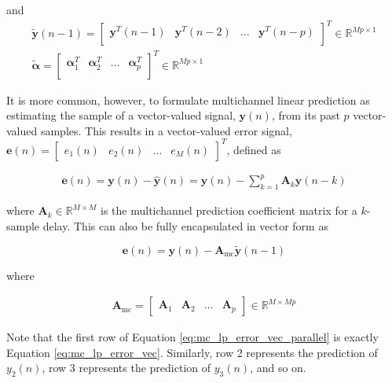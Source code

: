 \noindent
and
\begin{eqnarray}
	\boldsymbol{\tilde{y}}(n-1) = 
	\begin{bmatrix}
		\boldsymbol{y}^T(n-1) &	\boldsymbol{y}^T(n-2)  & \dots  & \boldsymbol{y}^T(n-p)   \\
	\end{bmatrix}^T  \in  \mathbb{R} ^ {Mp \times 1}\\
	\boldsymbol{\tilde{\alpha}} = 
	\begin{bmatrix}
		\boldsymbol{\alpha}^T_1 &	\boldsymbol{\alpha}^T_2  & \dots  & \boldsymbol{\alpha}^T_p \\
	\end{bmatrix}^T  \in  \mathbb{R} ^ {Mp \times 1}
\end{eqnarray}


It is more common, however, to formulate multichannel linear prediction as estimating the sample of a vector-valued signal, $\boldsymbol{y}(n)$, from its past $p$ vector-valued samples. This results in a vector-valued error signal, $\boldsymbol{e}(n) = \begin{bmatrix} e_1(n) & e_2(n) & \dots& e_M(n) \end{bmatrix}^T$, defined as

\begin{eqnarray}
	\boldsymbol{e}(n) = \boldsymbol{y}(n) - \boldsymbol{\hat{y}}(n) = \boldsymbol{y}(n) - \sum_{k=1}^{p} \boldsymbol{A}_k \boldsymbol{y}(n-k)  \label{eq:mc_lp_error_parallel}
\end{eqnarray}

\noindent
where $\boldsymbol{A}_k \in  \mathbb{R} ^ {M\times M}$ is the multichannel prediction coefficient matrix for a $k$-sample delay. This can also be fully encapsulated in vector form as

\begin{equation}
	\boldsymbol{e}(n)= \boldsymbol{y}(n) - \boldsymbol{A}_{\mathrm{mc}} \tilde{\boldsymbol{y}}(n-1) \label{eq:mc_lp_error_vec_parallel}
\end{equation}

\noindent
where

\begin{eqnarray}
	\boldsymbol{A}_{\mathrm{mc}} = \begin{bmatrix}
		\boldsymbol{A}_1 & \boldsymbol{A}_2 & \dots& \boldsymbol{A}_p
	\end{bmatrix} \in \mathbb{R}^{M \times Mp}
\end{eqnarray}

\noindent
Note that the first row of Equation \ref{eq:mc_lp_error_vec_parallel} is exactly Equation \ref{eq:mc_lp_error_vec}. Similarly, row 2 represents the prediction of $y_2(n)$, row 3 represents the prediction of $y_3(n)$, and so on.

